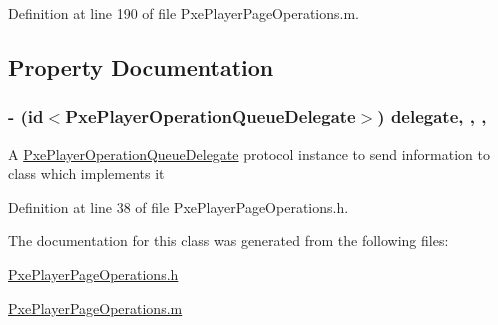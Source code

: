 Definition at line 190 of file Pxe\-Player\-Page\-Operations.\-m.



\subsection{Property Documentation}
\hypertarget{interface_pxe_player_page_operations_a7f4807bfd10dd5df697157d960312e01}{
\subsubsection[{delegate}]{\setlength{\rightskip}{0pt plus 5cm}-\/ (id$<${\bf Pxe\-Player\-Operation\-Queue\-Delegate}$>$) delegate\hspace{0.3cm}{\ttfamily [read]}, {\ttfamily [write]}, {\ttfamily [nonatomic]}, {\ttfamily [weak]}}}\label{interface_pxe_player_page_operations_a7f4807bfd10dd5df697157d960312e01}
A \hyperlink{protocol_pxe_player_operation_queue_delegate-p}{Pxe\-Player\-Operation\-Queue\-Delegate} protocol instance to send information to class which implements it 

Definition at line 38 of file Pxe\-Player\-Page\-Operations.\-h.



The documentation for this class was generated from the following files\-:\begin{DoxyCompactItemize}
\item 
\hyperlink{_pxe_player_page_operations_8h}{Pxe\-Player\-Page\-Operations.\-h}\item 
\hyperlink{_pxe_player_page_operations_8m}{Pxe\-Player\-Page\-Operations.\-m}\end{DoxyCompactItemize}
